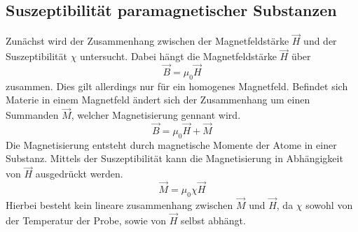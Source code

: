 \subsection{Suszeptibilität paramagnetischer Substanzen}
\label{subsec:Berechnung}

Zunächst wird der Zusammenhang zwischen der Magnetfeldstärke $\vec{H}$ und der Suszeptibilität $\chi$ untersucht. Dabei hängt die Magnetfeldstärke $\vec{H}$ über 
\begin{equation*}
    \vec{B} = \mu_0 \vec{H}
\end{equation*}
zusammen. Dies gilt allerdings nur für ein homogenes Magnetfeld. Befindet sich Materie in einem Magnetfeld ändert sich der Zusammenhang um einen Summanden $\vec{M}$, welcher 
Magnetisierung gennant wird.
\begin{equation*}
    \vec{B} = \mu_0 \vec{H} + \vec{M}
\end{equation*}
Die Magnetisierung entsteht durch magnetische Momente der Atome in einer Substanz. Mittels der Suszeptibilität kann die Magnetisierung in Abhängigkeit von $\vec{H}$
ausgedrückt werden. 
\begin{equation*}
    \vec{M} = \mu_0 \chi \vec{H}
\end{equation*}
Hierbei besteht kein lineare zusammenhang zwischen $\vec{M}$ und $\vec{H}$, da $\chi$ sowohl von der Temperatur der Probe, sowie von $\vec{H}$ selbst abhängt.
